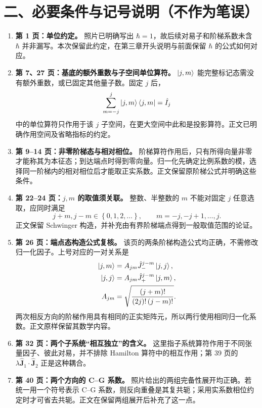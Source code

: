 \documentclass[UTF8,12pt,a4paper,fontset=fandol]{ctexart}
\begin{document}
\section*{二、必要条件与记号说明（不作为笔误）}
\begin{enumerate}
\item \textbf{第 1 页：单位约定。}
照片已明确写出 $\hbar=1$，故后续对易子和阶梯系数未含 $\hbar$ 并非漏写。本次保留此约定，在第三章开头说明与前面保留 $\hbar$ 的公式如何对应。

\item \textbf{第 7、27 页：基底的额外重数与子空间单位算符。}
$\Ket{j,m}$ 能完整标记态需没有额外重数，或已固定其他量子数。固定 $j$ 后，
\begin{equation}
\sum_{m=-j}^j\Ket{j,m}\Bra{j,m}=\hat I_j
\end{equation}
中的单位算符只作用于该 $j$ 子空间，在更大空间中此和是投影算符。正文已明确作用空间及省略指标的约定。

\item \textbf{第 9--14 页：非零阶梯态与相对相位。}
阶梯算符作用后，只有所得向量非零才能称其为本征态；到达端点时得到零向量。归一化先确定比例系数的模，选择同一阶梯内的相对相位后才能取正实系数。正文保留原阶梯公式并明确这些条件。

\item \textbf{第 22--24 页：$j,m$ 的取值须关联。}
整数、半整数的 $m$ 不能对固定 $j$ 任意选取，应同时满足
\begin{equation}
j+m,j-m\in\left\{0,1,2,\ldots\right\},\qquad
m=-j,-j+1,\ldots,j.
\end{equation}
正文保留 Schwinger 构造，并补充由有界阶梯端点得到一般取值范围的论证。

\item \textbf{第 26 页：端点态构造公式复核。}
该页的两条阶梯构造公式均正确，不需修改归一化因子。上号对应的一对关系是
\begin{align}
\Ket{j,m}&=A_{jm}\hat J_-^{j-m}\Ket{j,j},\\
\Ket{j,j}&=A_{jm}\hat J_+^{j-m}\Ket{j,m},\\
A_{jm}&=\sqrt{\frac{\left(j+m\right)!}{\left(2j\right)!\left(j-m\right)!}}.
\end{align}
两次相反方向的阶梯作用具有相同的正实矩阵元，所以两行使用相同归一化系数。正文原样保留其数学内容。

\item \textbf{第 32 页：两个子系统“相互独立”的含义。}
这里指子系统算符作用于不同张量因子、彼此对易，并不排除 Hamilton 算符中的相互作用；第 39 页的 $\lambda\hat{\bm J}_1\cdot\hat{\bm J}_2$ 正是这种耦合。

\item \textbf{第 40 页：两个方向的 C--G 系数。}
照片给出的两组完备性展开均正确。若统一用一个符号表示 C--G 系数，则反向重叠是其复共轭；采用实系数相位约定时才可省去共轭。正文在保留两组展开后补充了这一点。
\end{enumerate}
\end{document}
